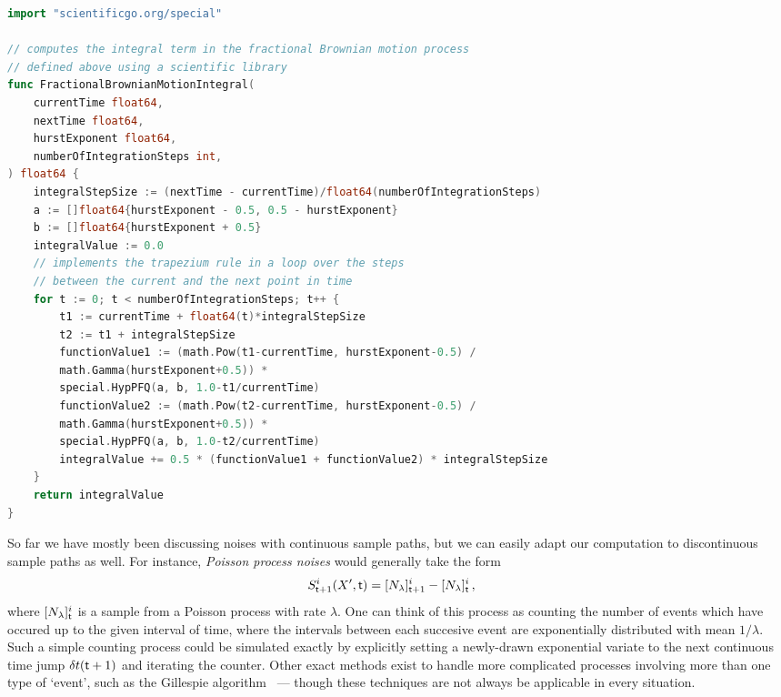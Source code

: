 \documentclass{book}
\begin{document}
\begin{lstlisting}[language=Go]
import "scientificgo.org/special"

// computes the integral term in the fractional Brownian motion process
// defined above using a scientific library
func FractionalBrownianMotionIntegral(
	currentTime float64,
	nextTime float64,
	hurstExponent float64,
	numberOfIntegrationSteps int,
) float64 {
	integralStepSize := (nextTime - currentTime)/float64(numberOfIntegrationSteps)
	a := []float64{hurstExponent - 0.5, 0.5 - hurstExponent}
	b := []float64{hurstExponent + 0.5}
	integralValue := 0.0
	// implements the trapezium rule in a loop over the steps
	// between the current and the next point in time
	for t := 0; t < numberOfIntegrationSteps; t++ {
		t1 := currentTime + float64(t)*integralStepSize
		t2 := t1 + integralStepSize
		functionValue1 := (math.Pow(t1-currentTime, hurstExponent-0.5) /
        math.Gamma(hurstExponent+0.5)) *
        special.HypPFQ(a, b, 1.0-t1/currentTime)
		functionValue2 := (math.Pow(t2-currentTime, hurstExponent-0.5) /
        math.Gamma(hurstExponent+0.5)) *
        special.HypPFQ(a, b, 1.0-t2/currentTime)
		integralValue += 0.5 * (functionValue1 + functionValue2) * integralStepSize
	}
	return integralValue
}
\end{lstlisting}

So far we have mostly been discussing noises with continuous sample paths, but we can easily adapt our computation to discontinuous sample paths as well. For instance, \emph{Poisson process noises} would generally take the form
\begin{align}
S^{i}_{{\sf t}+1}(X',{\sf t}) &= [N_{\lambda}]^i_{{\sf t}+1}-[N_{\lambda}]^i_{\sf t}\,,
\end{align}
where $[N_{\lambda}]^i_{\sf t}$ is a sample from a Poisson process with rate $\lambda$. One can think of this process as counting the number of events which have occured up to the given interval of time, where the intervals between each succesive event are exponentially distributed with mean $1/\lambda$. Such a simple counting process could be simulated exactly by explicitly setting a newly-drawn exponential variate to the next continuous time jump ${\delta t}({\sf t}+1)$ and iterating the counter. Other exact methods exist to handle more complicated processes involving more than one type of `event', such as the Gillespie algorithm~\cite{gillespie1977exact} --- though these techniques are not always be applicable in every situation.
\end{document}

